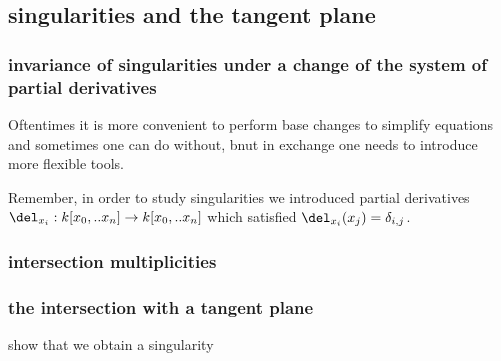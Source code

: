 
\subsection{singularities and the tangent plane}



\subsubsection{invariance of singularities under a change of the system of partial derivatives}

Oftentimes it is more convenient to perform base changes to simplify equations and sometimes one can do without, bnut in exchange one needs to introduce more flexible tools.

Remember, in order to study singularities we introduced partial derivatives $\del_{x_i} : k[x_0,..x_n] \to k[x_0,..x_n]$ which satisfied $\del_{x_i}(x_j) = \delta_{i,j}$.


\subsubsection{intersection multiplicities}


\subsubsection{the intersection with a tangent plane}

\begin{todo}
\item show that we obtain a singularity
\end{todo}


